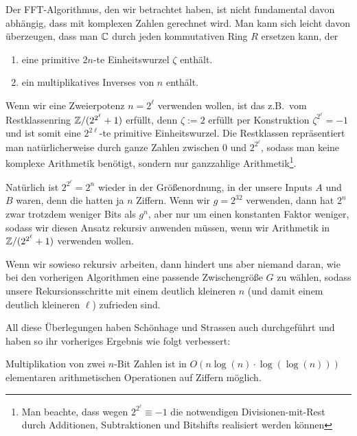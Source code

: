 \begin{remark}
    Der FFT-Algorithmus, den wir betrachtet haben, ist nicht fundamental davon abhängig, dass mit komplexen Zahlen gerechnet wird. Man kann sich leicht davon überzeugen, dass man $\mathbb{C}$ durch jeden kommutativen Ring $R$ ersetzen kann, der
    \begin{enumerate}
        \item eine primitive $2n$-te Einheitswurzel $\zeta$ enthält.
        \item ein multiplikatives Inverses von $n$ enthält.
    \end{enumerate}

    Wenn wir eine Zweierpotenz $n=2^\ell$ verwenden wollen, ist das z.B.\ vom Restklassenring $\mathbb{Z}/(2^{2^\ell}+1)$ erfüllt, denn $\zeta:=2$ erfüllt per Konstruktion $\zeta^{2^\ell} = -1$ und ist somit eine $2^{2\ell}$-te primitive Einheitswurzel. Die Restklassen repräsentiert man natürlicherweise durch ganze Zahlen zwischen $0$ und $2^{2^\ell}$, sodass man keine komplexe Arithmetik benötigt, sondern nur ganzzahlige Arithmetik\footnote{Man beachte, dass wegen $2^{2^\ell} \equiv -1$ die notwendigen Divisionen-mit-Rest durch Additionen, Subtraktionen und Bitshifts realisiert werden können}.

    \smallskip
    Natürlich ist $2^{2^\ell}=2^n$ wieder in der Größenordnung, in der unsere Inputs $A$ und $B$ waren, denn die hatten ja $n$ Ziffern. Wenn wir $g=2^{32}$ verwenden, dann hat $2^n$ zwar trotzdem weniger Bits als $g^n$, aber nur um einen konstanten Faktor weniger, sodass wir diesen Ansatz rekursiv anwenden müssen, wenn wir Arithmetik in $\mathbb{Z}/(2^{2^\ell}+1)$ verwenden wollen.

    Wenn wir sowieso rekursiv arbeiten, dann hindert uns aber niemand daran, wie bei den vorherigen Algorithmen eine passende Zwischengröße $G$ zu wählen, sodass unsere Rekursionsschritte mit einem deutlich kleineren $n$ (und damit einem deutlich kleineren $\ell$) zufrieden sind.

    \medskip
    All diese Überlegungen haben Schönhage und Strassen auch durchgeführt und haben so ihr vorheriges Ergebnis wie folgt verbessert:
\end{remark}

\begin{theorem}
    Multiplikation von zwei $n$-Bit Zahlen ist in $O(n\log(n)\cdot\log(\log(n)))$ elementaren arithmetischen Operationen auf Ziffern möglich.
\end{theorem}

